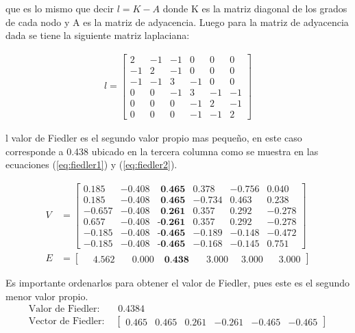 \documentclass[letterpaper]{article}
\begin{document}
que es lo mismo que decir $l = K - A$ donde K es la matriz diagonal de los grados de cada nodo y A es la matriz de adyacencia. Luego para la matriz de adyacencia dada se tiene la siguiente matriz laplaciana:

\begin{align}
l = \begin{bmatrix}
   2  &-1  &-1  & 0  & 0  & 0    \\
   -1 &  2 & -1 &  0 &  0 &  0   \\
   -1 & -1 &  3 & -1 &  0 &  0   \\
    0 &  0 & -1 &  3 & -1 & -1   \\
    0 &  0 &  0 & -1 &  2 & -1   \\
    0 &  0 &  0 & -1 & -1 &  2
\end{bmatrix}
\end{align}

l valor de Fiedler es el segundo valor propio mas pequeño, en este caso corresponde a 0.438 ubicado en la tercera columna como se muestra en las ecuaciones (\ref{eq:fiedler1}) y (\ref{eq:fiedler2}).


\begin{align}
  V &= \begin{bmatrix}
     0.185 & -0.408 & \textbf{ 0.465} &  0.378 & -0.756 &  0.040 \\
     0.185 & -0.408 & \textbf{ 0.465} & -0.734 &  0.463 &  0.238 \\
    -0.657 & -0.408 & \textbf{ 0.261} &  0.357 &  0.292 & -0.278 \\
     0.657 & -0.408 & \textbf{-0.261} &  0.357 &  0.292 & -0.278 \\
    -0.185 & -0.408 & \textbf{-0.465} & -0.189 & -0.148 & -0.472 \\
    -0.185 & -0.408 & \textbf{-0.465} & -0.168 & -0.145 &  0.751
  \end{bmatrix} \label{eq:fiedler1}\\
  E &= \begin{bmatrix} \quad 4.562 & \quad 0.000 & \; \textbf{0.438} & \quad 3.000 & \; \; 3.000 & \;\;\; 3.000 \end{bmatrix} \label{eq:fiedler2}
\end{align}

Es importante ordenarlos para obtener el valor de Fiedler, pues este es el segundo menor valor propio.
\begin{align}
  \text{Valor de Fiedler: }  & \; 0.4384\\
  \text{Vector de Fiedler: } & \begin{bmatrix}0.465 & 0.465 & 0.261 & -0.261 & -0.465 & -0.465\end{bmatrix}
\end{align}
\end{document}
